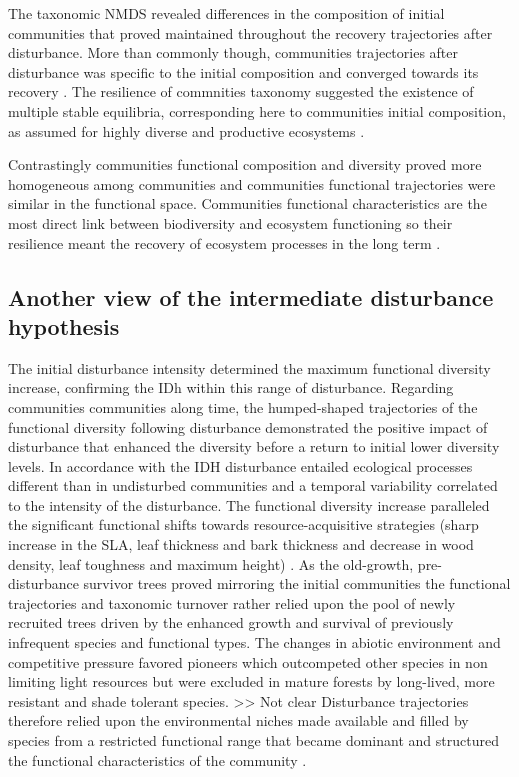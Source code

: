 \documentclass[fleqn,10pt]{ArtEcoFoG} %
\theoremstyle{definition}
\theoremstyle{definition}
\theoremstyle{definition}
\theoremstyle{remark}
\begin{document}
The taxonomic NMDS revealed differences in the composition of initial
communities that proved maintained throughout the recovery trajectories
after disturbance. More than commonly though, communities trajectories
after disturbance was specific to the initial composition and converged
towards its recovery
\citep{Hubbell1999, Molino2001, Anderson2007, Baraloto2012a}. The
resilience of commnities taxonomy suggested the existence of multiple
stable equilibria, corresponding here to communities initial
composition, as assumed for highly diverse and productive ecosystems
\citep{Chase2003}.

Contrastingly communities functional composition and diversity proved
more homogeneous among communities and communities functional
trajectories were similar in the functional space. Communities
functional characteristics are the most direct link between biodiversity
and ecosystem functioning \citep{Diaz2005} so their resilience meant the
recovery of ecosystem processes in the long term \citep{Guariguata2001}.

\subsection{Another view of the intermediate disturbance
hypothesis}\label{another-view-of-the-intermediate-disturbance-hypothesis}

The initial disturbance intensity determined the maximum functional
diversity increase, confirming the IDh within this range of disturbance.
Regarding communities communities along time, the humped-shaped
trajectories of the functional diversity following disturbance
demonstrated the positive impact of disturbance that enhanced the
diversity before a return to initial lower diversity levels. In
accordance with the IDH disturbance entailed ecological processes
different than in undisturbed communities and a temporal variability
correlated to the intensity of the disturbance. The functional diversity
increase paralleled the significant functional shifts towards
resource-acquisitive strategies (sharp increase in the SLA, leaf
thickness and bark thickness and decrease in wood density, leaf
toughness and maximum height)
\citep{Westoby1998, Wright2004, Reich2014}. As the old-growth,
pre-disturbance survivor trees proved mirroring the initial communities
\citep{Herault2018} the functional trajectories and taxonomic turnover
rather relied upon the pool of newly recruited trees driven by the
enhanced growth and survival of previously infrequent species and
functional types. The changes in abiotic environment and competitive
pressure favored pioneers which outcompeted other species in non
limiting light resources but were excluded in mature forests by
long-lived, more resistant and shade tolerant species.
\textgreater{}\textgreater{} Not clear Disturbance trajectories
therefore relied upon the environmental niches made available and filled
by species from a restricted functional range that became dominant and
structured the functional characteristics of the community
\citep{Grime1998}.
\end{document}
